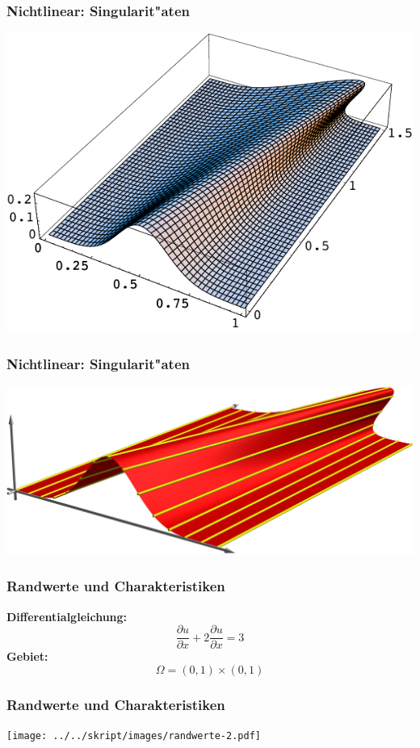 \documentclass{beamer}
\begin{document}
\begin{frame}
\frametitle{Nichtlinear: Singularit"aten}
\begin{center}
\includegraphics[width=\hsize]{../../skript/graphics/welle.pdf}
\end{center}
\end{frame}

\begin{frame}
\frametitle{Nichtlinear: Singularit"aten}
\begin{center}
\includegraphics[width=\hsize]{../../skript/graphics/welle.jpg}
\end{center}
\end{frame}

\begin{frame}
\frametitle{Randwerte und Charakteristiken}

{\bf Differentialgleichung:}
\[
\frac{\partial u}{\partial x}
+
2\frac{\partial u}{\partial x}
= 3
\]
{\bf Gebiet:}
\[
\Omega = (0,1)\times(0,1)
\]
\end{frame}

\begin{frame}
\frametitle{Randwerte und Charakteristiken}
\begin{center}
\texttt{[image: ../../skript/images/randwerte-2.pdf]}
\end{center}
\end{frame}
\end{document}
